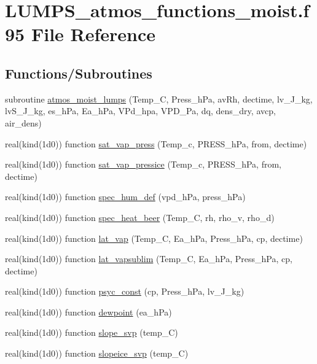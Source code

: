 \hypertarget{_l_u_m_p_s__atmos__functions__moist_8f95}{}\section{L\+U\+M\+P\+S\+\_\+atmos\+\_\+functions\+\_\+moist.\+f95 File Reference}
\label{_l_u_m_p_s__atmos__functions__moist_8f95}
\subsection*{Functions/\+Subroutines}
\begin{DoxyCompactItemize}
\item 
subroutine \hyperlink{_l_u_m_p_s__atmos__functions__moist_8f95_ae6aae41b4a8fe866a54025d8fbc439d2}{atmos\+\_\+moist\+\_\+lumps} (Temp\+\_\+C, Press\+\_\+h\+Pa, av\+Rh, dectime, lv\+\_\+\+J\+\_\+kg, lv\+S\+\_\+\+J\+\_\+kg, es\+\_\+h\+Pa, Ea\+\_\+h\+Pa, V\+Pd\+\_\+hpa, V\+P\+D\+\_\+\+Pa, dq, dens\+\_\+dry, avcp, air\+\_\+dens)
\item 
real(kind(1d0)) function \hyperlink{_l_u_m_p_s__atmos__functions__moist_8f95_a634f4cc5a636b7b311a16a1eb64e133e}{sat\+\_\+vap\+\_\+press} (Temp\+\_\+c, P\+R\+E\+S\+S\+\_\+h\+Pa, from, dectime)
\item 
real(kind(1d0)) function \hyperlink{_l_u_m_p_s__atmos__functions__moist_8f95_a8e723cdd557d577e5e646808dc572dc1}{sat\+\_\+vap\+\_\+pressice} (Temp\+\_\+c, P\+R\+E\+S\+S\+\_\+h\+Pa, from, dectime)
\item 
real(kind(1d0)) function \hyperlink{_l_u_m_p_s__atmos__functions__moist_8f95_a23dfe0352f06dab2858ae44f81b54a89}{spec\+\_\+hum\+\_\+def} (vpd\+\_\+h\+Pa, press\+\_\+h\+Pa)
\item 
real(kind(1d0)) function \hyperlink{_l_u_m_p_s__atmos__functions__moist_8f95_ad67fce32939b8349b7af6a3aa30d2d5b}{spec\+\_\+heat\+\_\+beer} (Temp\+\_\+C, rh, rho\+\_\+v, rho\+\_\+d)
\item 
real(kind(1d0)) function \hyperlink{_l_u_m_p_s__atmos__functions__moist_8f95_a8101e1e156dd288914e76a4dccb1a08d}{lat\+\_\+vap} (Temp\+\_\+C, Ea\+\_\+h\+Pa, Press\+\_\+h\+Pa, cp, dectime)
\item 
real(kind(1d0)) function \hyperlink{_l_u_m_p_s__atmos__functions__moist_8f95_ab3e9a8945e4ba8d534a51c3df7aa7948}{lat\+\_\+vapsublim} (Temp\+\_\+C, Ea\+\_\+h\+Pa, Press\+\_\+h\+Pa, cp, dectime)
\item 
real(kind(1d0)) function \hyperlink{_l_u_m_p_s__atmos__functions__moist_8f95_aca3cbb873a6638e6d630d35e0133d1dc}{psyc\+\_\+const} (cp, Press\+\_\+h\+Pa, lv\+\_\+\+J\+\_\+kg)
\item 
real(kind(1d0)) function \hyperlink{_l_u_m_p_s__atmos__functions__moist_8f95_afee63d3fd27358ee600477b7e71802ca}{dewpoint} (ea\+\_\+h\+Pa)
\item 
real(kind(1d0)) function \hyperlink{_l_u_m_p_s__atmos__functions__moist_8f95_ad8313c7c7528e6b2fad62cfa62efc4eb}{slope\+\_\+svp} (temp\+\_\+C)
\item 
real(kind(1d0)) function \hyperlink{_l_u_m_p_s__atmos__functions__moist_8f95_a80c8af865285c09ca0cc2de78ec85cb9}{slopeice\+\_\+svp} (temp\+\_\+C)
\end{DoxyCompactItemize}


